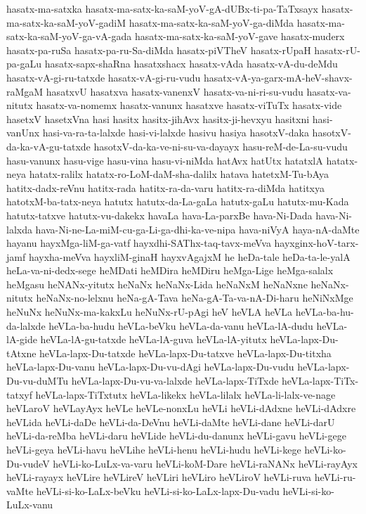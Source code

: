 {hasatx-ma-satxka
hasatx-ma-satx-ka-saM-yoV-gA-dUBx-ti-pa-TaTxsayx
hasatx-ma-satx-ka-saM-yoV-gadiM
hasatx-ma-satx-ka-saM-yoV-ga-diMda
hasatx-ma-satx-ka-saM-yoV-ga-vA-gada
hasatx-ma-satx-ka-saM-yoV-gave
hasatx-muderx
hasatx-pa-ruSa
hasatx-pa-ru-Sa-diMda
hasatx-piVTheV
hasatx-rUpaH
hasatx-rU-pa-gaLu
hasatx-sapx-shaRna
hasatxshacx
hasatx-vAda
hasatx-vA-du-deMdu
hasatx-vA-gi-ru-tatxde
hasatx-vA-gi-ru-vudu
hasatx-vA-ya-garx-mA-heV-shavx-raMgaM
hasatxvU
hasatxva
hasatx-vanenxV
hasatx-va-ni-ri-su-vudu
hasatx-va-nitutx
hasatx-va-nomemx
hasatx-vanunx
hasatxve
hasatx-viTuTx
hasatx-vide
hasetxV
hasetxVna
hasi
hasitx
hasitx-jihAvx
hasitx-ji-hevxyu
hasitxni
hasi-vanUnx
hasi-va-ra-ta-lalxde
hasi-vi-lalxde
hasivu
hasiya
hasotxV-daka
hasotxV-da-ka-vA-gu-tatxde
hasotxV-da-ka-ve-ni-su-va-dayayx
hasu-reM-de-La-su-vudu
hasu-vanunx
hasu-vige
hasu-vina
hasu-vi-niMda
hatAvx
hatUtx
hatatxlA
hatatx-neya
hatatx-ralilx
hatatx-ro-LoM-daM-sha-dalilx
hatava
hatetxM-Tu-bAya
hatitx-dadx-reVnu
hatitx-rada
hatitx-ra-da-varu
hatitx-ra-diMda
hatitxya
hatotxM-ba-tatx-neya
hatutx
hatutx-da-La-gaLa
hatutx-gaLu
hatutx-mu-Kada
hatutx-tatxve
hatutx-vu-dakekx
havaLa
hava-La-parxBe
hava-Ni-Dada
hava-Ni-lalxda
hava-Ni-ne-La-miM-cu-ga-Li-ga-dhi-ka-ve-nipa
hava-niVyA
haya-nA-daMte
hayanu
hayxMga-liM-ga-vatf
hayxdhi-SAThx-taq-tavx-meVva
hayxginx-hoV-tarx-jamf
hayxha-meVva
hayxliM-ginaH
hayxvAgajxM
he
heDa-tale
heDa-ta-le-yalA
heLa-va-ni-dedx-sege
heMDati
heMDira
heMDiru
heMga-Lige
heMga-salalx
heMgasu
heNANx-yitutx
heNaNx
heNaNx-Lida
heNaNxM
heNaNxne
heNaNx-nitutx
heNaNx-no-lelxnu
heNa-gA-Tava
heNa-gA-Ta-va-nA-Di-haru
heNiNxMge
heNuNx
heNuNx-ma-kakxLu
heNuNx-rU-pAgi
heV
heVLA
heVLa
heVLa-ba-hu-da-lalxde
heVLa-ba-hudu
heVLa-beVku
heVLa-da-vanu
heVLa-lA-dudu
heVLa-lA-gide
heVLa-lA-gu-tatxde
heVLa-lA-guva
heVLa-lA-yitutx
heVLa-lapx-Du-tAtxne
heVLa-lapx-Du-tatxde
heVLa-lapx-Du-tatxve
heVLa-lapx-Du-titxha
heVLa-lapx-Du-vanu
heVLa-lapx-Du-vu-dAgi
heVLa-lapx-Du-vudu
heVLa-lapx-Du-vu-duMTu
heVLa-lapx-Du-vu-va-lalxde
heVLa-lapx-TiTxde
heVLa-lapx-TiTx-tatxyf
heVLa-lapx-TiTxtutx
heVLa-likekx
heVLa-lilalx
heVLa-li-lalx-ve-nage
heVLaroV
heVLayAyx
heVLe
heVLe-nonxLu
heVLi
heVLi-dAdxne
heVLi-dAdxre
heVLida
heVLi-daDe
heVLi-da-DeVnu
heVLi-daMte
heVLi-dane
heVLi-darU
heVLi-da-reMba
heVLi-daru
heVLide
heVLi-du-danunx
heVLi-gavu
heVLi-gege
heVLi-geya
heVLi-havu
heVLihe
heVLi-henu
heVLi-hudu
heVLi-kege
heVLi-ko-Du-vudeV
heVLi-ko-LuLx-va-varu
heVLi-koM-Dare
heVLi-raNANx
heVLi-rayAyx
heVLi-rayayx
heVLire
heVLireV
heVLiri
heVLiro
heVLiroV
heVLi-ruva
heVLi-ru-vaMte
heVLi-si-ko-LaLx-beVku
heVLi-si-ko-LaLx-lapx-Du-vadu
heVLi-si-ko-LuLx-vanu
}
